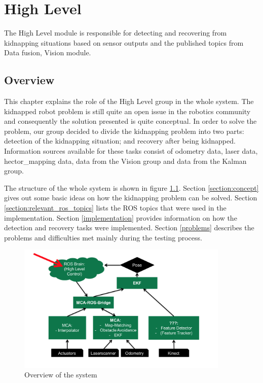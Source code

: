 \chapter{High Level}
The High Level module is responsible for detecting and recovering from  kidnapping situations based on sensor outputs and the published topics from  Data fusion, Vision module.

\label{High Level chapter}
\section{Overview}
This chapter explains the role of the High Level group in the whole system. The kidnapped robot problem is still quite an open issue in the robotics community and consequently the solution presented is quite conceptual. In order to solve the problem, our group decided to divide the kidnapping problem into two parts: detection of the kidnapping situation; and recovery after being kidnapped. Information sources available for these tasks consist of odometry data, laser data, hector\_mapping data, data from the Vision group and data from the Kalman group.

The structure of the whole system is shown in figure \ref{System}. Section \ref{section:concept} gives out some basic ideas on how the kidnapping problem can be solved. Section \ref{section:relevant_ros_topics} lists the ROS topics that were used in the implementation. Section \ref{implementation} provides information on how the detection and recovery tasks were implemented. Section \ref{problems} describes the problems and difficulties met mainly during the testing process.

\begin{figure}[htb]
\centering
\includegraphics[width=0.9\textwidth]{graphics/system.png}
\caption{Overview of the system}
\label{System}
\centering
\end{figure}

